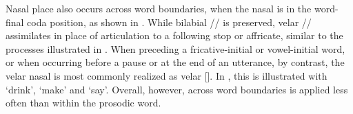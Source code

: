 \largerpage
Nasal place  also occurs across word boundaries, when the nasal is in the word-final coda position, as shown in . While bilabial // is preserved, velar // assimilates in place of articulation to a following stop or affricate, similar to the processes illustrated in . When preceding a fricative-initial or vowel-initial word, or when occurring before a pause or at the end of an utterance, by contrast, the velar nasal is most commonly realized as velar []. In , this is illustrated with  ‘drink’,  ‘make’ and  ‘say’. Overall, however,  across word boundaries is applied less often than within the prosodic word.

